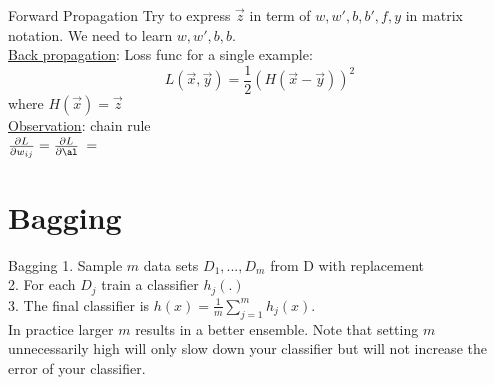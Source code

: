 \documentclass[aspectratio=1610]{beamer}
\begin{document}
\begin{frame}{Forward Propagation}
    Try to express $\Vec{z}$ in term of $w, w', b, b', f, y$ in matrix notation. We need to learn $w, w', b, b$.\\
    \underline{Back propagation}: Loss func for a single example:
    $$L(\Vec{x}, \Vec{y}) = \frac{1}{2}(H(\Vec{x} - \Vec{y}))^2$$
    where $H(\Vec{x}) = \Vec{z}$\\
    \underline{Observation}: chain rule\\[0.1cm]
    $\frac{\partial L}{\partial w_{ij}} = \frac{\partial L}{\partial \al}\frac{}{} = \frac{}{}$
\end{frame}


\section{Bagging}
\begin{frame}{Bagging}
    1. Sample $m$ data sets $D_1, ..., D_m$ from D with replacement\\
    2. For each $D_j$ train a classifier $h_j(.)$\\
    3. The final classifier is $h(x) = \frac{1}{m}\sum_{j=1}^{m}h_j(x)$.\\
In practice larger $m$ results in a better ensemble. Note that setting $m$ unnecessarily high will only slow down your classifier but will not increase the error of your classifier.
\end{frame}
\fi
\end{document}
